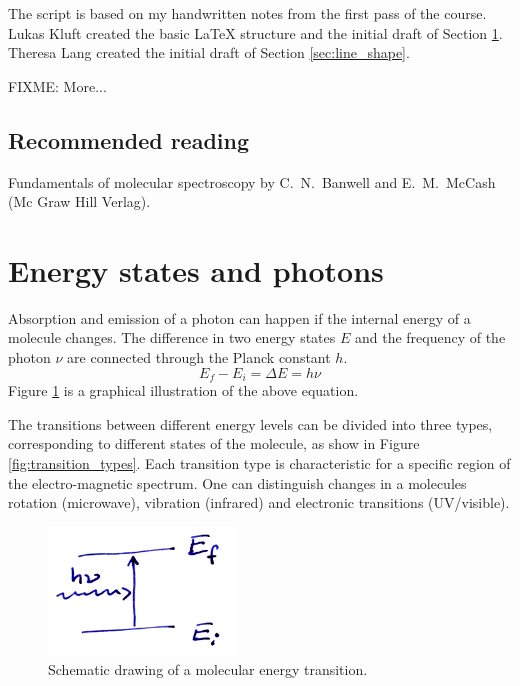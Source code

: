 The script is based on my handwritten notes from the first pass of the
course.  Lukas Kluft created the basic LaTeX structure and the initial
draft of Section \ref{sec:energy-states}. Theresa Lang created the
initial draft of Section \ref{sec:line_shape}.

FIXME: More...

\subsection*{Recommended reading}

Fundamentals of molecular spectroscopy by C.\ N.\
Banwell and E.\ M.\ McCash (Mc Graw Hill Verlag).


\section{Energy states and photons}
\label{sec:energy-states}
Absorption and emission of a photon can happen if the internal energy of a
molecule changes. The difference in two energy states $E$ and the frequency of
the photon $\nu$ are connected through the Planck constant $h$.
\begin{equation}
  E_f - E_i = \Delta E = h \nu
\end{equation}
Figure \ref{fig:schematic_energies} is a graphical illustration of the
above equation.

The transitions between different energy levels can be divided into
three types, corresponding to different states of the molecule, as
show in Figure \ref{fig:transition_types}.  Each transition type is
characteristic for a specific region of the electro-magnetic spectrum.
One can distinguish changes in a molecules rotation (microwave),
vibration (infrared) and electronic transitions (UV/visible).

\begin{figure}
  \centering
  \includegraphics[width=5cm]{figures/schematic_energy_states}
  \caption{Schematic drawing of a molecular energy transition.}
  \label{fig:schematic_energies}
\end{figure}

